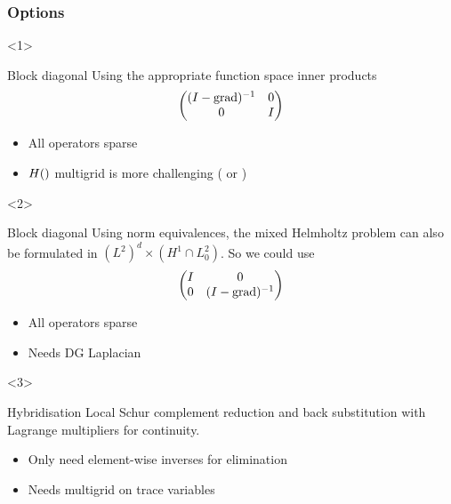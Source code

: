 \documentclass[presentation]{beamer}
\DeclareMathOperator{\grad}{grad}
\let\div\relax
\DeclareMathOperator{\div}{div}
\begin{document}
\begin{frame}[t]
  \frametitle{Options}
  \begin{onlyenv}<1>
    \begin{block}{Block diagonal}
      Using the appropriate function space inner
      products \parencite{Mardal:2011,Kirby:2010}
      \begin{equation*}
        \begin{pmatrix}
          (I - \grad \div)^{-1} & 0 \\
          0 & I\\
        \end{pmatrix}
      \end{equation*}
    \begin{itemize}
    \item All operators sparse
    \item $H(\div)$ multigrid is more challenging
      (\textcite{Arnold:2000} or \textcite{Hiptmair:2007})
    \end{itemize}
    \end{block}
  \end{onlyenv}
  \begin{onlyenv}<2>
    \begin{block}{Block diagonal}
      Using norm equivalences, the mixed Helmholtz problem can also be
      formulated in $(L^2)^d \times (H^1\cap L^2_0)$.  So we could use
      \begin{equation*}
        \begin{pmatrix}
          I & 0 \\
          0 & (I - \div \grad)^{-1}\\
        \end{pmatrix}
      \end{equation*}
  \begin{itemize}
  \item All operators sparse
  \item Needs DG Laplacian
  \end{itemize}
    \end{block}
  \end{onlyenv}
  \begin{onlyenv}<3>
    \begin{block}{Hybridisation}
      Local Schur complement reduction and back substitution with
      Lagrange multipliers for continuity.
      \begin{itemize}
      \item Only need element-wise inverses for elimination
      \item Needs multigrid on trace variables

\end{itemize}
\end{block}
\end{onlyenv}
\end{frame}
\end{document}
